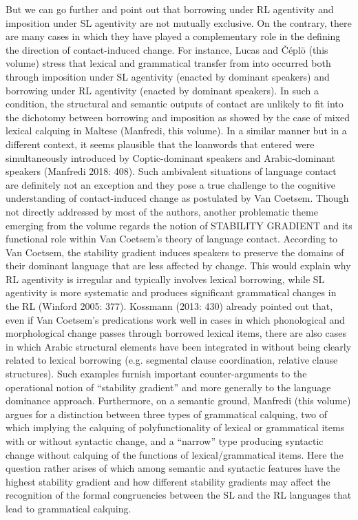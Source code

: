 \documentclass[output=paper]{langsci/langscibook}
\begin{document}
But we can go further and point out that borrowing under RL agentivity and imposition under SL agentivity are not mutually exclusive. On the contrary, there are many cases in which they have played a complementary role in the defining the direction of contact-induced change. For instance, Lucas and Čéplö (this volume) stress that lexical and grammatical transfer from  into  occurred both through imposition under SL agentivity (enacted by  dominant speakers) and borrowing under RL agentivity (enacted by  dominant speakers). In such a condition, the structural and semantic outputs of contact are unlikely to fit into the dichotomy between borrowing and imposition as showed by the case of mixed lexical calquing in Maltese (Manfredi, this volume). In a similar manner but in a different context, it seems plausible that the  loanwords that entered  were simultaneously introduced by Coptic-dominant speakers and Arabic-dominant speakers (Manfredi 2018: 408). Such ambivalent situations of language contact are definitely not an exception and they pose a true challenge to the cognitive understanding of contact-induced change as postulated by Van Coetsem.
Though not directly addressed by most of the authors, another problematic theme emerging from the volume regards the notion of STABILITY GRADIENT and its functional role within Van Coetsem’s theory of language contact. According to Van Coetsem, the stability gradient induces speakers to preserve the domains of their dominant language that are less affected by change. This would explain why RL agentivity is irregular and typically involves lexical borrowing, while SL agentivity is more systematic and produces significant grammatical changes in the RL (Winford 2005: 377). Kossmann (2013: 430) already pointed out that, even if Van Coetsem’s predications work well in cases in which phonological and morphological change passes through borrowed lexical items, there are also cases in which Arabic structural elements have been integrated in  without being clearly related to lexical borrowing (e.g. segmental clause coordination, relative clause structures). Such examples furnish important counter-arguments to the operational notion of “stability gradient” and more generally to the language dominance approach. Furthermore, on a semantic ground, Manfredi (this volume) argues for a distinction between three types of grammatical calquing, two of which implying the calquing of polyfunctionality of lexical or grammatical items with or without syntactic change, and a “narrow” type producing syntactic change without calquing of the functions of lexical/grammatical items. Here the question rather arises of which among semantic and syntactic features have the highest stability gradient and how different stability gradients may affect the recognition of the formal congruencies between the SL and the RL languages that lead to grammatical calquing. 
\end{document}
